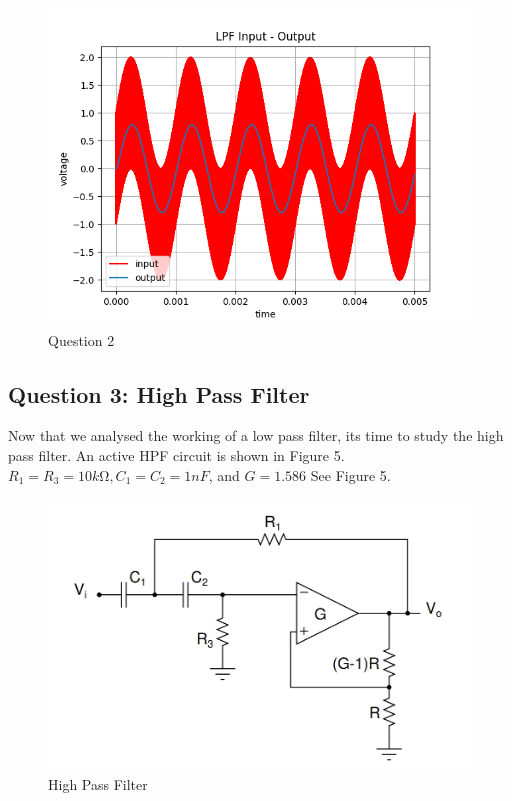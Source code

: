 \documentclass[11pt, a4paper]{article}
\begin{document}
  \begin{figure}[!tbh]
   	\centering
  \includegraphics[scale=0.5]{q2.png} 
    \caption{Question 2} 	
   \end{figure} 

\subsection{Question 3: High Pass Filter}
Now that we analysed the working of a low pass filter, its time to study the high pass filter. An active HPF circuit is shown in Figure 5. $R_1 = R_3 = 10kΩ, C_1 = C_2 = 1nF$, and $G = 1.586$
See Figure 5. 
  \begin{figure}[!tbh]
   	\centering
  \includegraphics[scale=0.5]{hpfckt.png} 
    \caption{High Pass Filter} 	
   \end{figure} 
\end{document}
